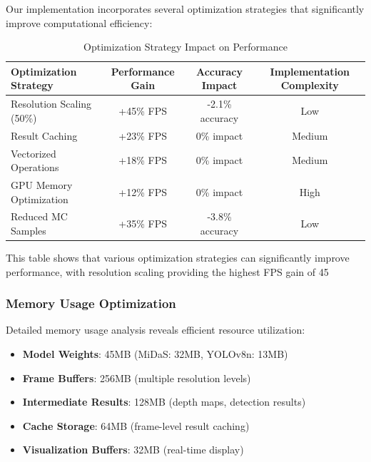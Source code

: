 \documentclass[12pt,oneside]{book}
\begin{document}
Our implementation incorporates several optimization strategies that significantly improve computational efficiency:

\begin{table}[ht]
\centering
\caption{Optimization Strategy Impact on Performance}
\label{tab:optimization_impact}
\begin{tabular}{@{}lccc@{}}
\toprule
\textbf{Optimization Strategy} & \textbf{Performance Gain} & \textbf{Accuracy Impact} & \textbf{Implementation Complexity} \\
\midrule
Resolution Scaling (50\%) & +45\% FPS & -2.1\% accuracy & Low \\
Result Caching & +23\% FPS & 0\% impact & Medium \\
Vectorized Operations & +18\% FPS & 0\% impact & Medium \\
GPU Memory Optimization & +12\% FPS & 0\% impact & High \\
Reduced MC Samples & +35\% FPS & -3.8\% accuracy & Low \\
\bottomrule
\end{tabular}
\end{table}

This table shows that various optimization strategies can significantly improve performance, with resolution scaling providing the highest FPS gain of 45%

\subsubsection{Memory Usage Optimization}

Detailed memory usage analysis reveals efficient resource utilization:

\begin{itemize}
\item \textbf{Model Weights}: 45MB (MiDaS: 32MB, YOLOv8n: 13MB)
\item \textbf{Frame Buffers}: 256MB (multiple resolution levels)
\item \textbf{Intermediate Results}: 128MB (depth maps, detection results)
\item \textbf{Cache Storage}: 64MB (frame-level result caching)
\item \textbf{Visualization Buffers}: 32MB (real-time display)
\end{itemize}
\end{document}
